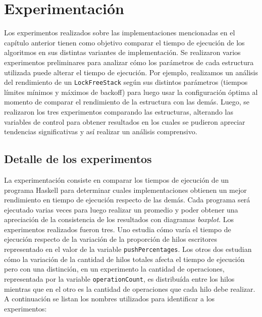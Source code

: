\chapter{Experimentación}
Los experimentos realizados sobre las implementaciones mencionadas en el capítulo anterior tienen como objetivo comparar el tiempo de ejecución de los algoritmos en sus distintas variantes de implementación. Se realizaron varios experimentos preliminares para analizar cómo los parámetros de cada estructura utilizada puede alterar el tiempo de ejecución. Por ejemplo, realizamos un análisis del rendimiento de un \texttt{LockFreeStack} según sus distintos parámetros (tiempos límites mínimos y máximos de backoff) para luego usar la configuración óptima al momento de comparar el rendimiento de la estructura con las demás. Luego, se realizaron los tres experimentos comparando las estructuras, alterando las variables de control para obtener resultados en los cuales se pudieron apreciar tendencias significativas y así realizar un análisis comprensivo.

\section{Detalle de los experimentos}

La experimentación consiste en comparar los tiempos de ejecución de un programa Haskell para determinar cuales implementaciones obtienen un mejor rendimiento en tiempo de ejecución respecto de las demás. Cada programa será ejecutado varias veces para luego realizar un promedio y poder obtener una apreciación de la consistencia de los resultados con diagramas \emph{boxplot}. Los experimentos realizados fueron tres. Uno estudia cómo varía el tiempo de ejecución respecto de la variación de la proporción de hilos escritores representado en el valor de la variable \texttt{pushPercentages}. Los otros dos estudian cómo la variación de la cantidad de hilos totales afecta el tiempo de ejecución pero con una distinción, en un experimento la cantidad de operaciones, representada por la variable \texttt{operationCount}, es distribuída entre los hilos mientras que en el otro es la cantidad de operaciones que cada hilo debe realizar. A continuación se listan los nombres utilizados para identificar a los experimentos:

